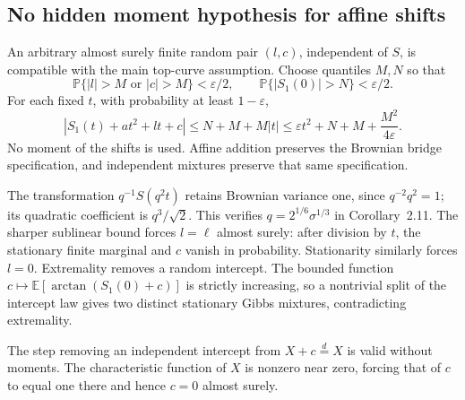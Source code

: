 \documentclass[10pt]{article}
\begin{document}
\subsection*{No hidden moment hypothesis for affine shifts}
An arbitrary almost surely finite random pair \((l,c)\), independent of \(S\), is compatible with the main top-curve assumption. Choose quantiles \(M,N\) so that \[\mathbb P\{|l|>M\text{ or }|c|>M\}<\varepsilon/2,\qquad
 \mathbb P\{|S_1(0)|>N\}<\varepsilon/2.\] For each fixed \(t\), with probability at least \(1-\varepsilon\), \[|S_1(t)+at^2+lt+c|
 \le N+M+M|t|
 \le\varepsilon t^2+N+M+\frac{M^2}{4\varepsilon}.\] No moment of the shifts is used. Affine addition preserves the Brownian bridge specification, and independent mixtures preserve that same specification.\par
The transformation \(q^{-1}S(q^2t)\) retains Brownian variance one, since \(q^{-2}q^2=1\); its quadratic coefficient is \(q^3/\sqrt2\). This verifies \(q=2^{1/6}\sigma^{1/3}\) in Corollary 2.11. The sharper sublinear bound forces \(l=\ell\) almost surely: after division by \(t\), the stationary finite marginal and \(c\) vanish in probability. Stationarity similarly forces \(l=0\). Extremality removes a random intercept. The bounded function \(c\mapsto\mathbb E[\arctan(S_1(0)+c)]\) is strictly increasing, so a nontrivial split of the intercept law gives two distinct stationary Gibbs mixtures, contradicting extremality.\par
The step removing an independent intercept from \(X+c\stackrel d=X\) is valid without moments. The characteristic function of \(X\) is nonzero near zero, forcing that of \(c\) to equal one there and hence \(c=0\) almost surely.\par
\end{document}
